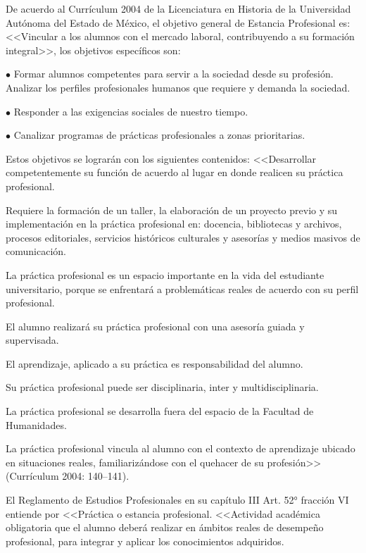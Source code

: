 De acuerdo al Currículum 2004 de la Licenciatura en Historia de la
Universidad Autónoma del Estado de México, el objetivo general de Estancia
Profesional es: <<Vincular a los alumnos con el mercado laboral,
contribuyendo a su formación integral>>, los objetivos específicos son:
\begin{Obs}
\item[$\bullet$] Formar alumnos competentes para servir a la sociedad desde su profesión.
Analizar los perfiles profesionales humanos que requiere y demanda la
sociedad.
\item[$\bullet$] Responder a las exigencias sociales de nuestro tiempo. 
\item[$\bullet$] Canalizar programas de prácticas profesionales a zonas prioritarias.
\end{Obs}

Estos objetivos se lograrán con los siguientes contenidos: <<Desarrollar
competentemente su función de acuerdo al lugar en donde realicen su
práctica profesional.

Requiere la formación de un taller, la elaboración de un proyecto previo y
su implementación en la práctica profesional en: docencia, bibliotecas y
archivos, procesos editoriales, servicios históricos culturales y asesorías
y medios masivos de comunicación.

La práctica profesional es un espacio importante en la vida del estudiante
universitario, porque se enfrentará a problemáticas reales de acuerdo con su
perfil profesional.
\enlargethispage{1\baselineskip}

El alumno realizará su práctica profesional con una asesoría guiada y
supervisada.

El aprendizaje, aplicado a su práctica es responsabilidad del alumno.

Su práctica profesional puede ser disciplinaria, inter y
multidisciplinaria.

La práctica profesional se desarrolla fuera del espacio de la Facultad de
Humanidades.

La práctica profesional vincula al alumno con el contexto de aprendizaje
ubicado en situaciones reales, familiarizándose con el quehacer de su
profesión>> (Currículum 2004: 140--141).

El Reglamento de Estudios Profesionales en su capítulo III Art. 52° fracción
VI entiende por <<Práctica o estancia profesional. <<Actividad académica
obligatoria que el alumno deberá realizar en ámbitos reales de desempeño
profesional, para integrar y aplicar los conocimientos adquiridos.
\enlargethispage{1\baselineskip}

